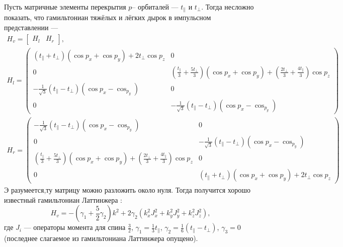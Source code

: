 Пусть матричные элементы перекрытия $p$-- орбиталей --- $t_\parallel$ и $t_\perp$. Тогда
несложно показать, что гамильтониан тяжёлых и лёгких дырок в импульсном представлении ---
\begin{equation}
    \begin{gathered}
    H_v = \begin{bmatrix}
            H_l & H_r
        \end{bmatrix},\\
    H_l = 
    \begin{pmatrix}
        (t_\parallel + t_\perp)(\cos{p_x} + \cos{p_y}) + 2t_\perp \cos{p_z} & 0 \\
        0 & \left(\frac{t_\parallel}{3} + \frac{5t_\perp}{3}\right)(\cos{p_x}+\cos{p_y})+ 
                           \left(\frac{2t_\perp}{3} + \frac{4t_\parallel}{3}\right)\cos{p_z} \\
        -\frac{1}{\sqrt{3}}(t_\parallel - t_\perp)(\cos{p_x} - \cos_{p_y}) & 0 \\
        0 & -\frac{1}{\sqrt{3}}(t_\parallel - t_\perp)(\cos{p_x} - \cos_{p_y}) 
    \end{pmatrix}\\
    H_r = 
    \begin{pmatrix}
        -\frac{1}{\sqrt{3}}(t_\parallel - t_\perp)(\cos{p_x} - \cos_{p_y}) & 0 \\
        0 & -\frac{1}{\sqrt{3}}(t_\parallel - t_\perp)(\cos{p_x} - \cos_{p_y})\\
       \left(\frac{t_\parallel}{3} + \frac{5t_\perp}{3}\right)(\cos{p_x} + \cos{p_y}) + 
                    \left(\frac{2t_\perp}{3} + \frac{4t_\parallel}{3}\right)\cos{p_z} & 0 \\
        0 & (t_\parallel + t_\perp)(\cos{p_x} + \cos{p_y}) + 2t_\perp \cos{p_z}
    \end{pmatrix}
    \end{gathered}
\end{equation}
Э разумеется,ту матрицу можно разложить около нуля. Тогда получится хорошо известный 
гамильтониан Латтинжера \cite{Luttinger1956}:
\begin{equation}
    H_v = -\left(\gamma_1 + \frac{5}{2}\gamma_2\right) k^2 + 
        2\gamma_2(k_x^2J_x^2 + k_y^2J_y^2 + k_z^2J_z^2),
\end{equation}
где $J_i$ --- операторы момента для спина $\frac{3}{2}$, $\gamma_1 = \frac13 t_\parallel$,
$\gamma_2 = \frac16(t_\parallel - t_\perp)$, $\gamma_3 = 0$ (последнее слагаемое 
из гамильтониана Латтинжера опущено).

